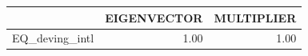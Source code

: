 \begin{tabular}{rrr}
  \hline
 & EIGENVECTOR & MULTIPLIER \\ 
  \hline
EQ\_deving\_intl & 1.00 & 1.00 \\ 
   \hline
\end{tabular}
